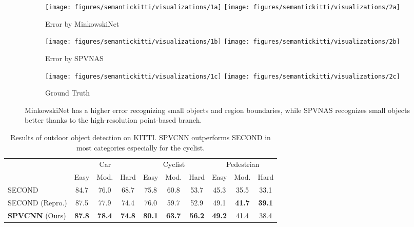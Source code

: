 \documentclass[runningheads]{llncs}
\def\cnnshort{SPVCNN\xspace}
\def\modelshort{SPVNAS\xspace}
\begin{document}
\begin{figure*}[t]
\begin{subfigure}[t]{0.325\linewidth}
    \centering
    \texttt{[image: figures/semantickitti/visualizations/1a]}
    \texttt{[image: figures/semantickitti/visualizations/2a]}
    \caption{Error by MinkowskiNet}
\end{subfigure}
\begin{subfigure}[t]{0.325\linewidth}
    \centering
    \texttt{[image: figures/semantickitti/visualizations/1b]}
    \texttt{[image: figures/semantickitti/visualizations/2b]}
    \caption{Error by \modelshort}
\end{subfigure}
\begin{subfigure}[t]{0.325\linewidth}
    \centering
    \texttt{[image: figures/semantickitti/visualizations/1c]}
    \texttt{[image: figures/semantickitti/visualizations/2c]}
    \caption{Ground Truth}
\end{subfigure}
\caption{MinkowskiNet has a higher error recognizing small objects and region boundaries, while SPVNAS recognizes small objects better thanks to the high-resolution point-based branch.}
\label{fig:semantickitti:visualizations}
\end{figure*} \begin{table}[t]
\setlength{\tabcolsep}{4.5pt}
\small\centering
\begin{tabular}{lccccccccc}
    \toprule
     & \multicolumn{3}{c}{Car} & \multicolumn{3}{c}{Cyclist} & \multicolumn{3}{c}{Pedestrian} \\
     \cmidrule(lr){2-4}\cmidrule(lr){5-7}\cmidrule(lr){8-10}
     & Easy & Mod. & Hard & Easy & Mod. & Hard & Easy & Mod. & Hard \\
    \midrule
    SECOND~\cite{yan2018second} & 84.7 & 76.0 & 68.7 & 75.8 & 60.8 & 53.7 & 45.3 & 35.5 & 33.1 \\
    SECOND (Repro.) & 87.5 & 77.9 & 74.4 & 76.0 & 59.7 & 52.9 & 49.1 & \textbf{41.7} & \textbf{39.1} \\
    \midrule
    \textbf{\cnnshort} (Ours) & \textbf{87.8} & \textbf{78.4} & \textbf{74.8} & \textbf{80.1} & \textbf{63.7} & \textbf{56.2} & \textbf{49.2} & 41.4 & 38.4 \\
    \bottomrule
\end{tabular}
\caption{Results of outdoor object detection on KITTI. \cnnshort outperforms SECOND in most categories especially for the cyclist.}
\label{tab:kitti:results}
\end{table} 
\end{document}
